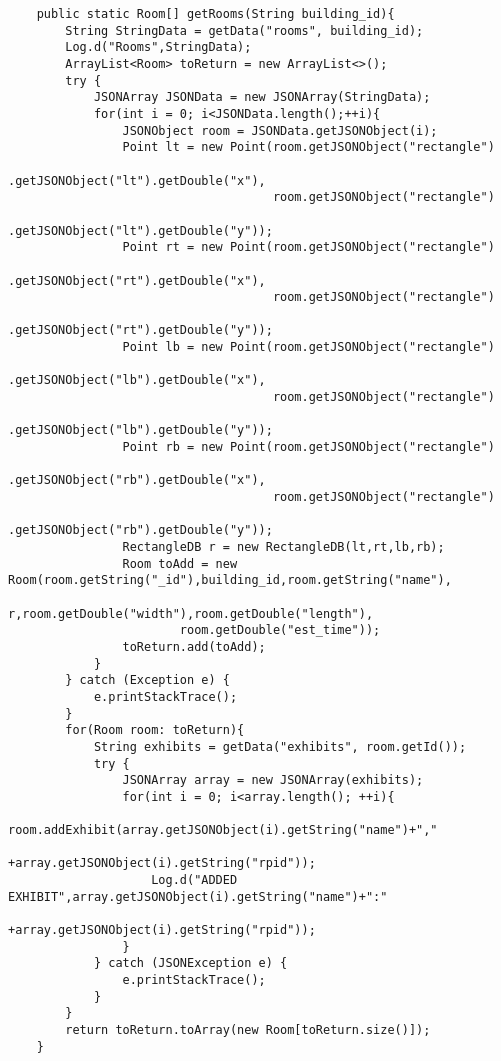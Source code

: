\begin{lstlisting}
    public static Room[] getRooms(String building_id){
        String StringData = getData("rooms", building_id);
        Log.d("Rooms",StringData);
        ArrayList<Room> toReturn = new ArrayList<>();
        try {
            JSONArray JSONData = new JSONArray(StringData);
            for(int i = 0; i<JSONData.length();++i){
                JSONObject room = JSONData.getJSONObject(i);
                Point lt = new Point(room.getJSONObject("rectangle")
                                         .getJSONObject("lt").getDouble("x"),
                                     room.getJSONObject("rectangle")
                                         .getJSONObject("lt").getDouble("y"));
                Point rt = new Point(room.getJSONObject("rectangle")
                                         .getJSONObject("rt").getDouble("x"),
                                     room.getJSONObject("rectangle")
                                         .getJSONObject("rt").getDouble("y"));
                Point lb = new Point(room.getJSONObject("rectangle")
                                         .getJSONObject("lb").getDouble("x"),
                                     room.getJSONObject("rectangle")
                                         .getJSONObject("lb").getDouble("y"));
                Point rb = new Point(room.getJSONObject("rectangle")
                                         .getJSONObject("rb").getDouble("x"),
                                     room.getJSONObject("rectangle")
                                         .getJSONObject("rb").getDouble("y"));
                RectangleDB r = new RectangleDB(lt,rt,lb,rb);
                Room toAdd = new Room(room.getString("_id"),building_id,room.getString("name"),
                        r,room.getDouble("width"),room.getDouble("length"),
                        room.getDouble("est_time"));
                toReturn.add(toAdd);
            }
        } catch (Exception e) {
            e.printStackTrace();
        }
        for(Room room: toReturn){
            String exhibits = getData("exhibits", room.getId());
            try {
                JSONArray array = new JSONArray(exhibits);
                for(int i = 0; i<array.length(); ++i){
                    room.addExhibit(array.getJSONObject(i).getString("name")+","
                            +array.getJSONObject(i).getString("rpid"));
                    Log.d("ADDED EXHIBIT",array.getJSONObject(i).getString("name")+":"
                            +array.getJSONObject(i).getString("rpid"));
                }
            } catch (JSONException e) {
                e.printStackTrace();
            }
        }
        return toReturn.toArray(new Room[toReturn.size()]);
    }


\end{lstlisting}
